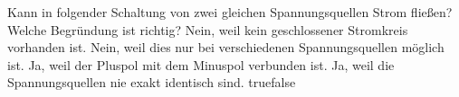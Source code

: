     {Kann in folgender Schaltung von zwei gleichen Spannungsquellen Strom fließen? Welche Begründung ist richtig?}
    {Nein, weil kein geschlossener Stromkreis vorhanden ist.}
    {Nein, weil dies nur bei verschiedenen Spannungsquellen möglich ist.}
    {Ja, weil der Pluspol mit dem Minuspol verbunden ist.}
    {Ja, weil die Spannungsquellen nie exakt identisch sind.}
    {true}{false}